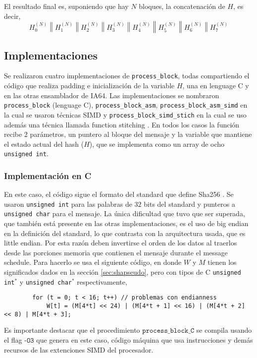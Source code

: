 El resultado final es, suponiendo que hay $N$ bloques, la concatenación de $H$, es decir,
            $$ H^{(N)}_0 \left\| H^{(N)}_1 \right\| H^{(N)}_2 \left\| H^{(N)}_3 \right\| H^{(N)}_4 \left\| H^{(N)}_5 \right\| H^{(N)}_6 \left\| H^{(N)}_7 \right. $$

\subsection{Implementaciones}
Se realizaron cuatro implementaciones de \texttt{process\_block}, todas compartiendo el código que realiza padding e inicialización de la variable $H$, una en lenguage C y en las otras ensamblador de IA64. Las implementaciones se nombraron \texttt{process\_block} (lenguage C), \texttt{process\_block\_asm}, \texttt{process\_block\_asm\_simd} en la cual se usaron técnicas SIMD y \texttt{process\_block\_simd\_stich} en la cual se uso además una técnica llamada function stitching . En todos los casos la función recibe 2 parámetros, un puntero al bloque del mensaje y la variable que mantiene el estado actual del hash ($H$), que se implementa como un array de ocho \texttt{unsigned int}.\\

\subsubsection{Implementación en C}
\label{sec:impshac}
En este caso, el código sigue el formato del standard que define Sha256 \cite{Fips}. Se usaron \texttt{unsigned int} para las palabras de $32$ bits del standard y punteros a \texttt{unsigned char} para el mensaje. La única dificultad que tuvo que ser superada, que también está presente en las otras implementaciones, es el uso de big endian en la definición del standard, lo que contrasta con la arquitectura usada, que es little endian. Por esta razón deben invertirse el orden de los datos al traerlos desde las porciones memoria que contienen el mensaje durante el message schedule. Para hacerlo se usa el siguiente código, en donde $W$ y $M$ tienen los significados dados en la sección \ref{sec:shapseudo}, pero con tipos de C \texttt{unsigned int$^*$} y \texttt{unsigned char$^*$} respectivamente, 
\begin{verbatim} 
        for (t = 0; t < 16; t++) // problemas con endianness                                                 
            W[t] = (M[4*t] << 24) | (M[4*t + 1] << 16) | (M[4*t + 2] << 8) | M[4*t + 3];
\end{verbatim}
\indent Es importante destacar que el procedimiento $\texttt{process\_block\_C}$ se compila usando el flag $\texttt{-O3}$ que genera en este caso, código máquina que usa instrucciones y demás recursos de las extenciones SIMD del procesador.


